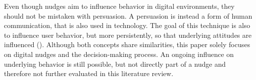 Even though nudges aim to influence behavior in digital environments, they should not be mistaken with persuasion. A persuasion is instead a form of human communication, that is also used in technology. The goal of this technique is also to influence user behavior, but more persistently, so that underlying attitudes are influenced (\cite{oinas-kukkonen_persuasive_2009}). Although both concepts share similarities, this paper solely focuses on digital nudges and the decision-making process. An ongoing influence on underlying behavior is still possible, but not directly part of a nudge and therefore not further evaluated in this literature review.

